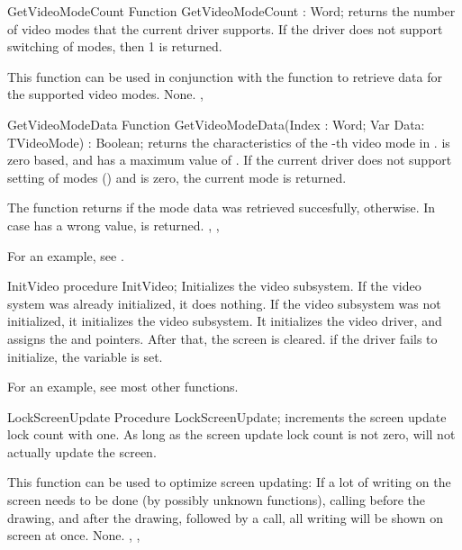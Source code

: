 
\begin{function}{GetVideoModeCount}
\Declaration
Function GetVideoModeCount : Word;
\Description
{} returns the number of video modes that the current
driver supports. If the driver does not support switching of modes, then 1
is returned.

This function can be used in conjunction with the 
function to retrieve data for the supported video modes.
\Errors
None.
\SeeAlso
{}, 
\end{function}


\begin{function}{GetVideoModeData}
\Declaration
Function GetVideoModeData(Index : Word; Var Data: TVideoMode) : Boolean;  
\Description
{} returns the characteristics of the -th
video mode in .  is zero based, and has a maximum value of
. If the current driver does not support setting of
modes () and  is zero, the current mode 
is returned.

The function returns  if the mode data was retrieved succesfully,
 otherwise.
\Errors
In case  has a wrong value,  is returned.
\SeeAlso
{}, , 
\end{function}

For an example, see .

\begin{procedure}{InitVideo}
\Declaration
procedure InitVideo; 
\Description
{} Initializes the video subsystem. If the video system was
already initialized, it does nothing. If the video subsystem was not
initialized, it initializes the video subsystem. It initializes the video
driver, and assigns the  and  pointers. After
that, the screen is cleared.
\Errors
if the driver fails to initialize, the  variable is set.
\SeeAlso
{}
\end{procedure}

For an example, see most other functions.

\begin{procedure}{LockScreenUpdate}
\Declaration
Procedure LockScreenUpdate;
\Description
{} increments the screen update lock count with one.
As long as the screen update lock count is not zero, 
will not actually update the screen.

This function can be used to optimize screen updating: If a lot of writing
on the screen needs to be done (by possibly unknown functions), calling
 before the drawing, and 
after the drawing, followed by a  call, all writing will
be shown on screen at once.
\Errors
None.
\SeeAlso
{}, , 
\end{procedure}

